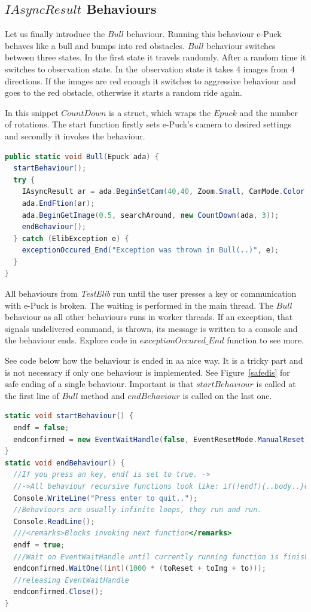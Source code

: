 \subsection{$IAsyncResult$ Behaviours}\label{sec:bull}
  Let us finally introduce the $Bull$ behaviour.
  Running this behaviour e-Puck behaves like a bull and bumps into red obstacles.
  $Bull$ behaviour switches between three states. In the first state it travels randomly. 
  After a random time it switches to observation state.
  In the~observation state it takes 4 images from 4 directions. If the images are red enough 
  it switches to aggressive behaviour and goes to the red obstacle,
  otherwise it starts a random ride again.

  In this snippet $CountDown$ is a struct, which wraps the $Epuck$ and the number of rotations.
  The start function firstly sets e-Puck's camera to desired settings and secondly it invokes the behaviour.

\begin{lstlisting}[language=cs]
public static void Bull(Epuck ada) {
  startBehaviour();
  try {
    IAsyncResult ar = ada.BeginSetCam(40,40, Zoom.Small, CamMode.Color, toSetCam, null, null);
    ada.EndFtion(ar);
    ada.BeginGetImage(0.5, searchAround, new CountDown(ada, 3));
    endBehaviour();
  } catch (ElibException e) {
    exceptionOccured_End("Exception was thrown in Bull(..)", e);
  }
}
\end{lstlisting}
  
  All behaviours from {\it TestElib} run until the user presses a key or communication with e-Puck is broken. 
  The waiting is performed in the main thread. 
  The $Bull$ behaviour as all other behaviours runs in worker threads.
  If an exception, that signals undelivered command, is thrown, 
  its message is written to a console and the behaviour ends. 
  Explore code in $exceptionOccured\_End$ function to see more.

  See code below how the behaviour is ended in aa  nice way. 
  It is a tricky part and is not necessary if only one behaviour is implemented. See Figure~\ref{safedis}
  for safe ending of a single behaviour.
  Important is that $startBehaviour$ is called at the first line of $Bull$ method 
  and $endBehaviour$ is called on the last one.
\begin{lstlisting}[language=cs]
static void startBehaviour() {
  endf = false;
  endconfirmed = new EventWaitHandle(false, EventResetMode.ManualReset);
}
static void endBehaviour() {        
  //If you press an key, endf is set to true. ->
  //->All behaviour recursive functions look like: if(!endf){..body..}else endconfirmed.Set();
  Console.WriteLine("Press enter to quit..");
  //Behaviours are usually infinite loops, they run and run.
  Console.ReadLine();
  ///<remarks>Blocks invoking next function</remarks>
  endf = true;
  ///Wait on EventWaitHandle until currently running function is finished.
  endconfirmed.WaitOne((int)(1000 * (toReset + toImg + to)));
  //releasing EventWaitHandle
  endconfirmed.Close();
}
\end{lstlisting}

